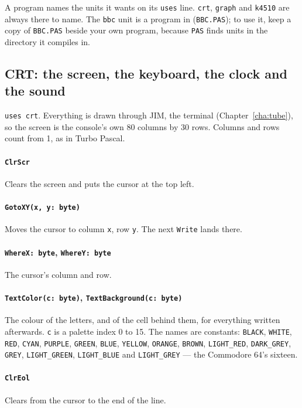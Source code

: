 \medskip\noindent A program names the units it wants on its \verb|uses| line.
\verb|crt|, \verb|graph| and \verb|k4510| are always there to name. The
\verb|bbc| unit is a program in  (\texttt{BBC.PAS}); to
use it, keep a copy of \texttt{BBC.PAS} beside your own program, because
\verb|PAS| finds units in the directory it compiles in.

\subsection*{CRT: the screen, the keyboard, the clock and the sound}
\verb|uses crt|. Everything is drawn through JIM, the terminal
(Chapter~\ref{cha:tube}), so the screen is the console's own 80 columns by
30 rows. Columns and rows count from 1, as in Turbo Pascal.

\paragraph{\texttt{ClrScr}} Clears the screen and puts the cursor at the top
left.

\paragraph{\texttt{GotoXY(x, y: byte)}} Moves the cursor to column \verb|x|,
row \verb|y|. The next \verb|Write| lands there.

\paragraph{\texttt{WhereX: byte}, \texttt{WhereY: byte}} The cursor's column
and row.

\paragraph{\texttt{TextColor(c: byte)}, \texttt{TextBackground(c: byte)}} The
colour of the letters, and of the cell behind them, for everything written
afterwards. \verb|c| is a palette index 0 to 15. The names are constants:
\verb|BLACK|, \verb|WHITE|, \verb|RED|, \verb|CYAN|, \verb|PURPLE|,
\verb|GREEN|, \verb|BLUE|, \verb|YELLOW|, \verb|ORANGE|, \verb|BROWN|,
\verb|LIGHT_RED|, \verb|DARK_GREY|, \verb|GREY|, \verb|LIGHT_GREEN|,
\verb|LIGHT_BLUE| and \verb|LIGHT_GREY| --- the Commodore 64's sixteen.

\paragraph{\texttt{ClrEol}} Clears from the cursor to the end of the line.

